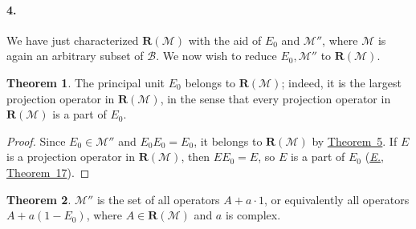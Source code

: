 \documentclass[
  paper=b5,
  twoside=true,
  fontsize=13pt,
  headings=normal,
  bookmarkpackage=false
]{scrartcl}
\theoremstyle{definition}
\newtheorem{theorem}{Theorem}
\newcommand{\TheoremRef}[1]{\hyperref[thm:#1]{Theorem~#1}}
\newcommand{\Eref}{\hyperref[fn:E-paper]{\emph{E.}}}
\newcommand{\ErefText}[1]{\href{https://doi.org/10.1007/BF01782338}{#1}}
\newcommand{\GeneratedRing}{\boldsymbol{R}}
\begin{document}
\paragraph*{4.}\label{sec:ii-4}
We have just characterized \(\GeneratedRing (\mathcal M)\) with the aid of \(E_0\)
and \(\mathcal M''\), where \(\mathcal M\) is again an arbitrary subset
of \(\mathcal B\).  We now wish to reduce \(E_0,\mathcal M''\) to
\(\GeneratedRing (\mathcal M)\).

\begin{theorem}\label{thm:6}
The principal unit \(E_0\) belongs to \(\GeneratedRing (\mathcal M)\); indeed, it is
the largest projection operator in \(\GeneratedRing (\mathcal M)\), in the sense that
every projection operator in \(\GeneratedRing (\mathcal M)\) is a part of \(E_0\).
\end{theorem}

\begin{proof}
Since \(E_0\in\mathcal M''\) and \(E_0E_0=E_0\), it belongs to
\(\GeneratedRing (\mathcal M)\) by \TheoremRef{5}. If \(E\) is a projection operator
in \(\GeneratedRing (\mathcal M)\), then \(EE_0=E\), so \(E\) is a part of \(E_0\)
(\Eref, \ErefText{Theorem~17}).
\end{proof}

\begin{theorem}\label{thm:7}
\(\mathcal M''\) is the set of all operators \(A+a\cdot1\), or
equivalently all operators \(A+a(1-E_0)\), where \(A\in \GeneratedRing (\mathcal M)\)
and \(a\) is complex.
\end{theorem}
\end{document}
